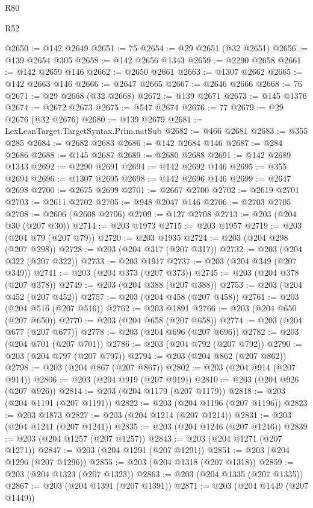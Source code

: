\begin{lexlean}{R80}
\begin{lexlean}{R52}
\begin{coremodule}
{{{{{{{{{{{{{{{{{{{{{{{{{{{{{{{{{{{{{{{{{{{{{{{{{{{{{{{{{{{{{{{{{{{{{{{{{{{{{{{{{{{{{{{{{{{{{{{{{{{{{{{{{{{{{{{{{{{{{{{{{{{{{{{{{{{{{{{{{{{{{{{{{{{{{{{{{{{{{{{{{{{{{{{{{{{{{{{{{{{{{{{{{{{{{{{{{{{{{{@2650 := @142 @2649
@2651 := 75
@2654 := @29 @2651 (@32 @2651)
@2656 := @139 @2654 @305
@2658 := @142 @2656 @1343
@2659 := @2290 @2658
@2661 := @142 @2659 @146
@2662 := @2650 @2661
@2663 := @1307 @2662
@2665 := @142 @2663 @146
@2666 := @2647 @2665
@2667 := @2646 @2666
@2668 := 76
@2671 := @29 @2668 (@32 @2668)
@2672 := @139 @2671
@2673 := @145 @1376
@2674 := @2672 @2673
@2675 := @547 @2674
@2676 := 77
@2679 := @29 @2676 (@32 @2676)
@2680 := @139 @2679
@2681 := LexLeanTarget.TargetSyntax.Prim.natSub
@2682 := @466 @2681
@2683 := @355 @285
@2684 := @2682 @2683
@2686 := @142 @2684 @146
@2687 := @284 @2686
@2688 := @145 @2687
@2689 := @2680 @2688
@2691 := @142 @2689 @1343
@2692 := @2290 @2691
@2694 := @142 @2692 @146
@2695 := @355 @2694
@2696 := @1307 @2695
@2698 := @142 @2696 @146
@2699 := @2647 @2698
@2700 := @2675 @2699
@2701 := @2667 @2700
@2702 := @2619 @2701
@2703 := @2611 @2702
@2705 := @948 @2047 @146
@2706 := @2703 @2705
@2708 := @2606 (@2608 @2706)
@2709 := @127 @2708
@2713 := @203 (@204 @30 (@207 @30))
@2714 := @203 @1973
@2715 := @203 @1957
@2719 := @203 (@204 @79 (@207 @79))
@2720 := @203 @1935
@2724 := @203 (@204 @298 (@207 @298))
@2728 := @203 (@204 @317 (@207 @317))
@2732 := @203 (@204 @322 (@207 @322))
@2733 := @203 @1917
@2737 := @203 (@204 @349 (@207 @349))
@2741 := @203 (@204 @373 (@207 @373))
@2745 := @203 (@204 @378 (@207 @378))
@2749 := @203 (@204 @388 (@207 @388))
@2753 := @203 (@204 @452 (@207 @452))
@2757 := @203 (@204 @458 (@207 @458))
@2761 := @203 (@204 @516 (@207 @516))
@2762 := @203 @1891
@2766 := @203 (@204 @650 (@207 @650))
@2770 := @203 (@204 @658 (@207 @658))
@2774 := @203 (@204 @677 (@207 @677))
@2778 := @203 (@204 @696 (@207 @696))
@2782 := @203 (@204 @701 (@207 @701))
@2786 := @203 (@204 @792 (@207 @792))
@2790 := @203 (@204 @797 (@207 @797))
@2794 := @203 (@204 @862 (@207 @862))
@2798 := @203 (@204 @867 (@207 @867))
@2802 := @203 (@204 @914 (@207 @914))
@2806 := @203 (@204 @919 (@207 @919))
@2810 := @203 (@204 @926 (@207 @926))
@2814 := @203 (@204 @1179 (@207 @1179))
@2818 := @203 (@204 @1191 (@207 @1191))
@2822 := @203 (@204 @1196 (@207 @1196))
@2823 := @203 @1873
@2827 := @203 (@204 @1214 (@207 @1214))
@2831 := @203 (@204 @1241 (@207 @1241))
@2835 := @203 (@204 @1246 (@207 @1246))
@2839 := @203 (@204 @1257 (@207 @1257))
@2843 := @203 (@204 @1271 (@207 @1271))
@2847 := @203 (@204 @1291 (@207 @1291))
@2851 := @203 (@204 @1296 (@207 @1296))
@2855 := @203 (@204 @1318 (@207 @1318))
@2859 := @203 (@204 @1323 (@207 @1323))
@2863 := @203 (@204 @1335 (@207 @1335))
@2867 := @203 (@204 @1391 (@207 @1391))
@2871 := @203 (@204 @1449 (@207 @1449))
}}}}}}}}}}}}}}}}}}}}}}}}}}}}}}}}}}}}}}}}}}}}}}}}}}}}}}}}}}}}}}}}}}}}}}}}}}}}}}}}}}}}}}}}}}}}}}}}}}}}}}}}}}}}}}}}}}}}}}}}}}}}}}}}}}}}}}}}}}}}}}}}}}}}}}}}}}}}}}}}}}}}}}}}}}}}}}}}}}}}}}}}}}}}}}}}}}}}}}
\end{coremodule}
\end{lexlean}
\end{lexlean}
